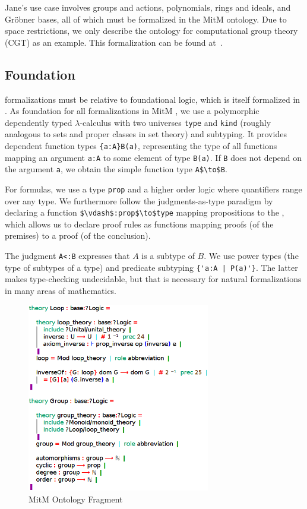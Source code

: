 Jane's use case involves groups and actions, polynomials, rings and ideals, and Gröbner bases, all of which must be formalized in the MitM ontology.
Due to space restrictions, we only describe the ontology for computational group theory (CGT) as an example.
This formalization can be found at~\cite{mitm:groups:on}.

\subsection{Foundation}

\OMMT formalizations must be relative to foundational logic, which is itself formalized in \OMMT.
As foundation for all formalizations in MitM \cite{mitm:foundation:on}, we use a polymorphic dependently typed $\lambda$-calculus with two universes \lstinline|type| and \lstinline|kind| (roughly analogous to sets and proper classes in set theory) and subtyping.
It provides dependent function types \lstinline|{a:A}B(a)|, representing the type of all functions mapping an argument \lstinline|a:A| to some element of type \lstinline|B(a)|. If \lstinline|B| does not depend on the argument \lstinline|a|, we obtain the simple function type \lstinline[mathescape]|A$\to$B|.

For formulas, we use a type \lstinline|prop| and a higher order logic where quantifiers range over any type.
We furthermore follow the judgments-as-type paradigm by declaring a function \lstinline[mathescape]|$\vdash$:prop$\to$type| mapping propositions to the , which allows us to declare proof rules as functions mapping proofs (of the premises) to a proof (of the conclusion).

The judgment \lstinline|A<:B| expresses that $A$ is a subtype of $B$.
We use power types (the type of subtypes of a type) and predicate subtyping \lstinline?{'a:A | P(a)'}?.
The latter makes type-checking undecidable, but that is necessary for natural formalizations in many areas of mathematics.

\begin{figure}[ht]\centering
  \includegraphics[width=8cm]{../D6.8/groups}
  \caption{MitM Ontology Fragment}\label{fig:mitm1}
\end{figure}

